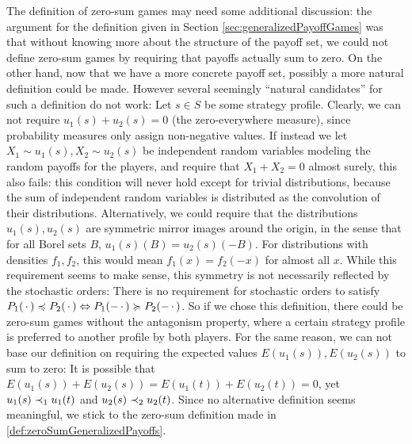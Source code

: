 \documentclass[a4paper]{scrreprt}
\theoremstyle{definition}
\begin{document}
    The definition of zero-sum games may need some additional discussion: the argument for the definition given in Section \ref{sec:generalizedPayoffGames} was that without knowing more about the structure of the payoff set, we could not define zero-sum games by requiring that payoffs actually sum to zero.
    On the other hand, now that we have a more concrete payoff set, possibly a more natural definition could be made.    
    However several seemingly “natural candidates” for such a definition do not work: Let $s \in S$ be some strategy profile.
    Clearly, we can not require $u_1(s) + u_2(s) = 0$ (the zero-everywhere measure), since probability measures only assign non-negative values.
    If instead we let $X_1 \sim u_1(s), X_2 \sim u_2(s)$ be independent random variables modeling the random payoffs for the players, and require that $X_1 + X_2 = 0$ almost surely, this also fails: this condition will never hold except for trivial distributions, because the sum of independent random variables is distributed as the convolution of their distributions.
    Alternatively, we could require that the distributions $u_1(s), u_2(s)$ are symmetric mirror images around the origin, in the sense that for all Borel sets $B$, $u_1(s)(B) = u_2(s)(-B)$. For distributions with densities $f_1, f_2$, this would mean $f_1(x) = f_2(-x)$ for almost all $x$.
    While this requirement seems to make sense, this symmetry is not necessarily reflected by the stochastic orders: There is no requirement for stochastic orders to satisfy $P_1(\,\cdot\,) \preccurlyeq P_2(\,\cdot\,) \Leftrightarrow P_1(-\,\cdot\,) \succcurlyeq P_2(-\,\cdot\,)$. So if we chose this definition, there could be zero-sum games without the antagonism property, where a certain strategy profile is preferred to another profile by both players.
    For the same reason, we can not base our definition on requiring the expected values $E(u_1(s)), E(u_2(s))$ to sum to zero: It is possible that $E(u_1(s)) + E(u_2(s)) = E(u_1(t)) + E(u_2(t)) = 0$, yet $u_1(s) \dstrnonpref_1 u_1(t)$ and $u_2(s) \dstrnonpref_2 u_2(t)$.
    Since no alternative definition seems meaningful, we stick to the zero-sum definition made in \ref{def:zeroSumGeneralizedPayoffs}.
\end{document}
